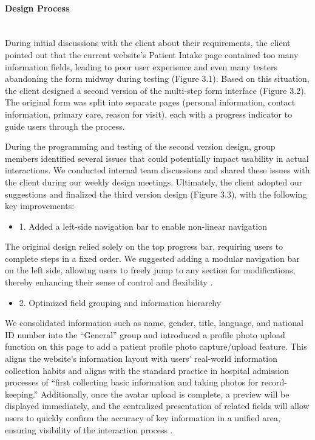 %
%
%

\paragraph{Design Process}\mbox{}\\
During initial discussions with the client about their requirements, the client pointed out that the current website's Patient Intake page contained too many information fields, leading to poor user experience and even many testers abandoning the form midway during testing (Figure 3.1). Based on this situation, the client designed a second version of the multi-step form interface (Figure 3.2). The original form was split into separate pages (personal information, contact information, primary care, reason for visit), each with a progress indicator to guide users through the process.

During the programming and testing of the second version design, group members identified several issues that could potentially impact usability in actual interactions. We conducted internal team discussions and shared these issues with the client during our weekly design meetings. Ultimately, the client adopted our suggestions and finalized the third version design (Figure 3.3), with the following key improvements:

\begin{itemize}
    \item 1. Added a left-side navigation bar to enable non-linear navigation
\end{itemize}
The original design relied solely on the top progress bar, requiring users to complete steps in a fixed order. We suggested adding a modular navigation bar on the left side, allowing users to freely jump to any section for modifications, thereby enhancing their sense of control and flexibility \cite{nielsen1995}.

\begin{itemize}
    \item 2. Optimized field grouping and information hierarchy
\end{itemize}
We consolidated information such as name, gender, title, language, and national ID number into the “General” group and introduced a profile photo upload function on this page to add a patient profile photo capture/upload feature. This aligns the website's information layout with users' real-world information collection habits and aligns with the standard practice in hospital admission processes of “first collecting basic information and taking photos for record-keeping.” Additionally, once the avatar upload is complete, a preview will be displayed immediately, and the centralized presentation of related fields will allow users to quickly confirm the accuracy of key information in a unified area, ensuring visibility of the interaction process \cite{nielsen1995}.

